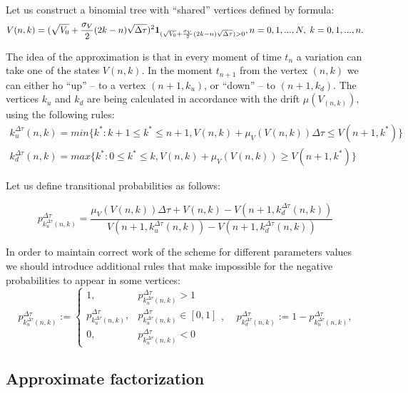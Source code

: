 \documentclass[a4paper]{jpconf}
\begin{document}
Let us construct a binomial tree with ``shared'' vertices defined by formula:
\begin{equation*}	
V(n,k) = (\sqrt{V_0} + \frac{\sigma_V}{2}(2k-n)\sqrt{\Delta \tau})^2 {\bf 1}_{(\sqrt{V_0} + \frac{\sigma_V}{2}(2k-n)\sqrt{\Delta \tau}) > 0}, 
\\ n = 0,1,...,N, \; k = 0,1,...,n.
\end{equation*}

The idea of the approximation is that in every moment of time $t_n$ a variation can take one of the states $V(n,k)$. In the moment $t_{n+1}$ from the vertex $(n,k)$ we can either ho ``up'' -- to a vertex $(n+1,k_u)$, or ``down'' -- to $(n+1,k_d)$. The vertices $k_u$ and $k_d$ are being calculated in accordance with the drift $\mu(V_{(n,k)})$, using the following rules:
\begin{eqnarray*}
	k_u^{\Delta \tau}(n,k) = min\{{k^\ast} : k + 1 \le k^\ast \le n + 1, V(n,k) + \mu_{V}(V(n,k)){\Delta \tau} \le V(n+1,k^\ast)\} \\
	k_d^{\Delta \tau}(n,k) = max\{{k^\ast} : 0 \le k^\ast \le k, V(n,k) + \mu_{V}(V(n,k)) \ge V(n+1,k^\ast)\}
\end{eqnarray*}

Let us define transitional probabilities as follows:

$$
p^{\Delta \tau}_{k^{\Delta \tau}_{u}(n,k)} = 
\frac{\mu_{V}(V(n,k))\Delta \tau+V(n,k)-V(n+1,k^{\Delta \tau}_{d}(n,k))}{V(n+1,k^{\Delta \tau}_{u}(n,k))-V(n+1,k^{\Delta \tau}_{d}(n,k))}
$$

In order to maintain correct work of the scheme for different parameters values we should introduce additional rules that make impossible for the negative probabilities to appear in some vertices:
\begin{equation*}
p^{\Delta \tau}_{k^{\Delta \tau}_{u}(n,k)} :=
\begin{cases}
1, & p^{\Delta \tau}_{k^{\Delta \tau}_{u}(n,k)} > 1\\
p^{\Delta \tau}_{k^{\Delta \tau}_{u}(n,k)}, & p^{\Delta \tau}_{k^{\Delta \tau}_{u}(n,k)} \in [0, 1]\\
0, & p^{\Delta \tau}_{k^{\Delta \tau}_{u}(n,k)} < 0
\end{cases}
, \;\;\;\; p^{\Delta \tau}_{k^{\Delta \tau}_{d}(n,k)} := 1 - p^{\Delta \tau}_{k^{\Delta \tau}_{u}(n,k)},
\end{equation*}

\subsection{Approximate factorization}
\end{document}
